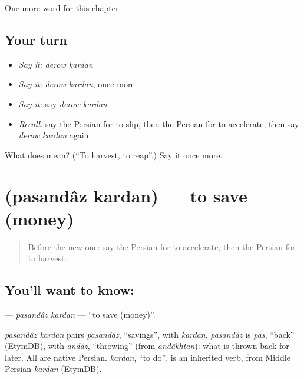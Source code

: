 \begin{grammarlens}[title={What you've built}]
One more word for this chapter.
\end{grammarlens}

\subsection*{Your turn}
\begin{itemize}
\raggedright
  \item \emph{Say it:} \emph{derow kardan}
  \item \emph{Say it:} \emph{derow kardan}, once more
  \item \emph{Say it:} say \emph{derow kardan}
  \item \emph{Recall:} say the Persian for to slip, then the Persian for to accelerate, then say \emph{derow kardan} again
\end{itemize}

\begin{tcolorbox}[breakable,colback=teal!4,colframe=teal!35!black,title={Before you move on}]
What does   mean? (\textquotedblleft{}To harvest, to reap\textquotedblright{}.) Say it once more.
\end{tcolorbox}
\section[\texorpdfstring{\fa{پس} \fa{انداز} \fa{کردن} (pasandâz kardan)}{پس انداز کردن (pasandâz kardan)}]{   (pasandâz kardan) — to save (money)}

\label{lesson:FA-C187-pasandaz-kardan}



\begin{quote}
Before the new one: say the Persian for to accelerate, then the Persian for to harvest.
\end{quote}

\subsection*{You'll want to know:   }
\textbf{  } — \emph{pasandâz kardan} — \textquotedblleft{}to save (money)\textquotedblright{}.

\begin{cousinweb}
\emph{pasandâz kardan} pairs \emph{pasandâz}, \textquotedblleft{}savings\textquotedblright{}, with \emph{kardan}. \emph{pasandâz} is \emph{pas}, \textquotedblleft{}back\textquotedblright{} (EtymDB), with \emph{andâz}, \textquotedblleft{}throwing\textquotedblright{} (from \emph{andâkhtan}): what is thrown back for later. All are native Persian. \emph{kardan}, \textquotedblleft{}to do\textquotedblright{}, is an inherited verb, from Middle Persian \emph{kardan} (EtymDB).
\end{cousinweb}

